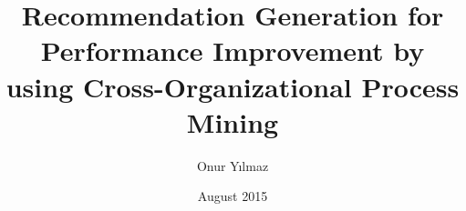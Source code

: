\documentclass[chaparabic,ceng,ms,12pt,oneandhalf]{metu}
\author{Onur Yılmaz}
\title{Recommendation Generation for Performance Improvement by using Cross-Organizational Process Mining}
\date{August 2015}
\theoremstyle{definition}
\begin{document}
\begin{preliminaries}


\end{preliminaries}
%   
% 
%









%


\appendix

 
%
% 
\end{document}
